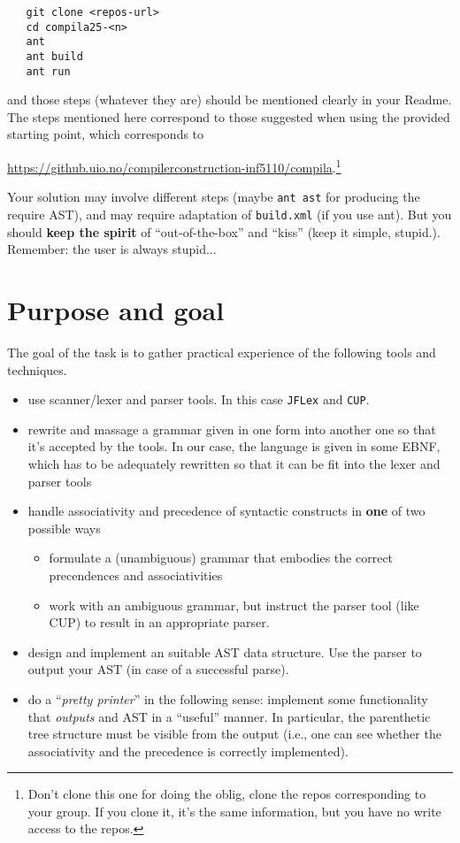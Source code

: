 \documentclass[10pt,freeform]{handout}[2014/08/13]
\begin{document}
\begin{verbatim}
   git clone <repos-url>
   cd compila25-<n>
   ant
   ant build
   ant run
\end{verbatim}
and those steps (whatever they are) should be mentioned clearly in your
Readme. The steps mentioned here correspond to those suggested when using
the provided starting point, which corresponds to
\begin{center}
  \url{https://github.uio.no/compilerconstruction-inf5110/compila}.\footnote{Don't
    clone this one for doing the oblig, clone the repos corresponding to
    your group. If you clone it, it's the same information, but you have no
    write access to the repos.}
\end{center}
Your solution may involve different steps (maybe \texttt{ant ast} for
producing the require AST), and may require adaptation of \texttt{build.xml}
(if you use ant). But you should \textbf{keep the spirit} of
``out-of-the-box'' and ``kiss'' (keep it simple, stupid.). Remember: the
user is always stupid...





\section{Purpose and goal}
\label{sec:x}

The goal of the task is to gather practical experience of the following
tools and techniques.
\begin{itemize}
\item use scanner/lexer and parser tools. In this case \texttt{JFLex} and
  \texttt{CUP}.
\item rewrite and massage a grammar given in one form into another one so
  that it's accepted by the tools. In our case, the language is given in
  some EBNF, which has to be adequately rewritten so that it can be fit
  into the lexer and parser tools
\item handle associativity and precedence of syntactic constructs in
  \textbf{one} of two possible ways
  \begin{itemize}
  \item formulate a (unambiguous) grammar that embodies the correct
    precendences and associativities
  \item work with an ambiguous grammar, but instruct the parser tool (like
    CUP) to result in an appropriate parser.
  \end{itemize}
\item design and implement an suitable AST data structure.  Use the parser
  to output your AST (in case of a successful parse).
\item do a ``\emph{pretty printer}'' in the following sense: implement some
  functionality that \emph{outputs} and AST in a ``useful'' manner. In
  particular, the parenthetic tree structure must be visible from the
  output (i.e., one can see whether the associativity and the precedence is
  correctly implemented). 
\end{itemize}
\end{document}
